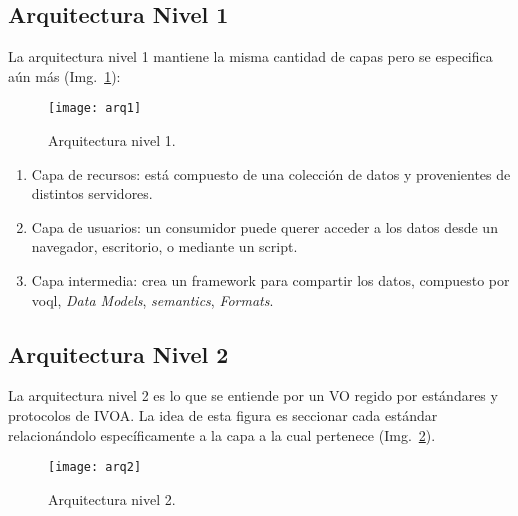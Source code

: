 \subsection{Arquitectura Nivel 1}

La arquitectura nivel 1 mantiene la misma cantidad de capas pero se especifica aún más (Img.~\ref{img:arq1}):

\begin{figure}[ht!]
	\centering
	\texttt{[image: arq1]}
	\caption{Arquitectura nivel 1.}
	\label{img:arq1}

\end{figure}

\begin{enumerate}
	\item Capa de recursos: está compuesto de una colección de datos y provenientes de distintos servidores.
	\item Capa de usuarios: un consumidor puede querer acceder a los datos desde un navegador, escritorio, o mediante un script.
	\item Capa intermedia: crea un framework para compartir los datos, compuesto por \gls{voql}, \emph{Data Models}, \emph{semantics}, \emph{Formats}.
\end{enumerate}

\subsection{
Arquitectura Nivel 2}

La arquitectura nivel 2 es lo que se entiende por un VO regido por estándares y protocolos de IVOA. La idea de esta figura es seccionar cada estándar relacionándolo específicamente a la capa a la cual pertenece (Img.~\ref{img:arq2}).


\begin{figure}[ht!]
	\centering
	\texttt{[image: arq2]}
	\caption{Arquitectura nivel 2.}
	\label{img:arq2}
\end{figure}
